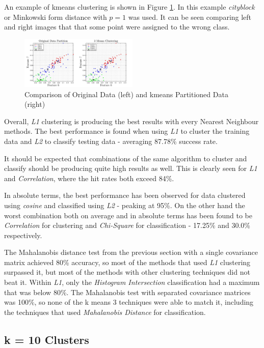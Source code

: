 \documentclass[10pt,twocolumn,letterpaper]{article}
\begin{document}
An example of kmeans clustering is shown in Figure \ref{fig:clusFig}. In this example \textit{cityblock} or Minkowski form distance with $p=1$ was used. It can be seen comparing left and right images that that some point were assigned to the wrong class.

\begin{figure}
\centering
\includegraphics[width=0.5\textwidth]{../results/kmeans_part}
\caption{Comparison of Original Data (left) and kmeans Partitioned Data (right)
\label{fig:clusFig}}
\end{figure}
 
Overall, \textit{L1} clustering is producing the best results with every Nearest Neighbour methods. The best performance is found when using \textit{L1} to cluster the training data and \textit{L2} to classify testing data - averaging 87.78\% success rate.

It should be expected that combinations of the same algorithm to cluster and classify should be producing quite high results as well. This is clearly seen for \textit{L1} and \textit{Correlation}, where the hit rates both exceed 84\%.

In absolute terms, the best performance has been observed for data clustered using \textit{cosine} and classified using \textit{L2} - peaking at 95\%. On the other hand the worst combination both on average and in absolute terms has been found to be \textit{Correlation} for clustering and \textit{Chi-Square} for classification - 17.25\% and 30.0\% respectively.
 
The Mahalanobis distance test from the previous section with a single covariance matrix achieved 80\% accuracy, so most of the methods that used \textit{L1} clustering surpassed it, but most of the methods with other clustering techniques did not beat it. Within \textit{L1}, only the \textit{Histogram Intersection} classification had a maximum that was below 80\%. The Mahalanobis test with separated covariance matrices was 100\%, so none of the k means 3 techniques were able to match it, including the techniques that used \textit{Mahalanobis Distance} for classification.
 
\subsection{k = 10 Clusters}
\end{document}
